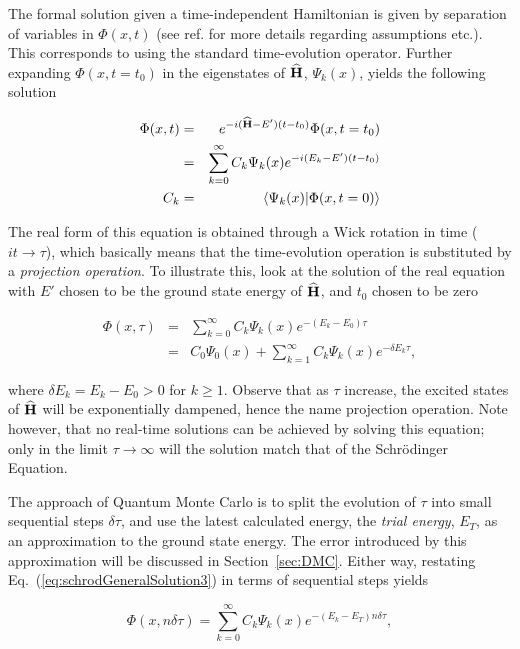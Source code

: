 The formal solution given a time-independent Hamiltonian is given by separation of variables in $\Phi(x, t)$ (see ref. \cite{griffiths} for more details regarding assumptions etc.). This corresponds to using the standard time-evolution operator. Further expanding $\Phi(x, t=t_0)$ in the eigenstates of ${\bf\widehat{H}}$, $\Psi_k(x)$, yields the following solution

\begin{eqnarray}
 \Phi(x, t) &=& e^{-i({\bf\widehat{H}} - E')(t-t_0)}\Phi(x, t=t_0) \label{eq:schrodGeneralSolution} \\
            &=& \sum_{k=0}^{\infty} C_k\Psi_k(x)e^{-i(E_k - E')(t-t_0)} \label{eq:realSchrod} \\
 C_k &=& \left\langle \Psi_k(x) | \Phi(x, t=0)\right\rangle \nonumber
 \end{eqnarray}


The real form of this equation is obtained through a Wick rotation in time ($it \rightarrow \tau$), which basically means that the time-evolution operation is substituted by a \textit{projection operation}. To illustrate this, look at the solution of the real equation with $E'$ chosen to be the ground state energy of ${\bf\widehat{H}}$, and $t_0$ chosen to be zero

\begin{eqnarray}
 \Phi(x, \tau) &=& \sum_{k=0}^{\infty} C_k\Psi_k(x)e^{-(E_k - E_0)\tau} \label{eq:schrodGeneralSolution3}\\
                    &=& C_0\Psi_0(x) + \sum_{k=1}^{\infty} C_k\Psi_k(x)e^{-\delta E_k\tau}, \label{eq:schrodGeneralSolution2}
\end{eqnarray}

where $\delta E_k = E_k - E_0 > 0$ for $k \ge 1$. Observe that as $\tau$ increase, the excited states of ${\bf\widehat{H}}$ will be exponentially dampened, hence the name projection operation. Note however, that no real-time solutions can be achieved by solving this equation; only in the limit $\tau\rightarrow\infty$ will the solution match that of the Schrödinger Equation. 

The approach of Quantum Monte Carlo is to split the evolution of $\tau$ into small sequential steps $\delta\tau$, and use the latest calculated energy, the \textit{trial energy}, $E_T$, as an approximation to the ground state energy. The error introduced by this approximation will be discussed in Section~\ref{sec:DMC}. Either way, restating Eq.~(\ref{eq:schrodGeneralSolution3}) in terms of sequential steps yields

\begin{equation}
  \Phi(x, n\delta\tau) = \sum_{k=0}^{\infty} C_k\Psi_k(x)e^{-(E_k - E_T)n\delta\tau} \label{eq:genSolTimeSteps},
\end{equation}

